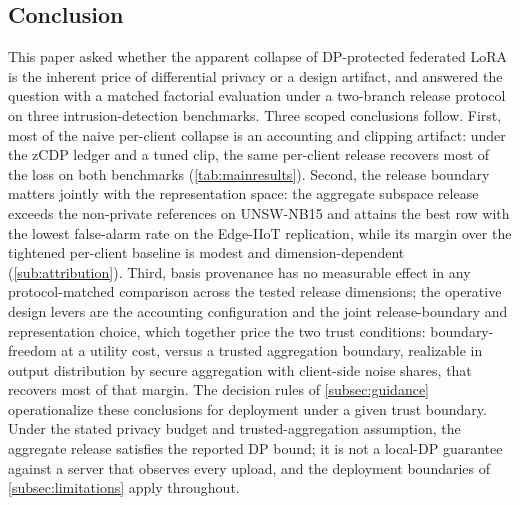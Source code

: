 \documentclass[a4paper,fleqn]{cas-dc}
\begin{document}
\subsection{Conclusion}
\par
This paper asked whether the apparent collapse of DP-protected federated
LoRA is the inherent price of differential privacy or a design artifact, and
answered the question with a matched factorial evaluation under a two-branch
release protocol on three intrusion-detection benchmarks. Three scoped
conclusions follow. First, most of the naive per-client collapse is an
accounting and clipping artifact: under the zCDP ledger and a tuned clip,
the same per-client release recovers most of the loss on both
benchmarks (\cref{tab:mainresults}). Second, the release boundary matters jointly with the
representation space: the aggregate subspace release exceeds the non-private
references on UNSW-NB15 and attains the best row with the lowest false-alarm
rate on the Edge-IIoT replication, while its margin over the tightened
per-client baseline is modest and dimension-dependent
(\cref{sub:attribution}). Third, basis provenance has no measurable
effect in any protocol-matched comparison across the tested release dimensions; the operative design levers are the
accounting configuration and the joint release-boundary and representation
choice, which together price the two trust conditions: boundary-freedom at a
utility cost, versus a trusted aggregation boundary, realizable in output
distribution by secure aggregation with client-side noise shares, that
recovers most of that margin. The decision rules of
\cref{subsec:guidance} operationalize these conclusions for
deployment under a given trust boundary. Under the stated privacy budget and
trusted-aggregation assumption, the aggregate release satisfies the reported
DP bound; it is not a local-DP guarantee against a server that observes every
upload, and the deployment boundaries of \cref{subsec:limitations}
apply throughout.
\par
\appendix
\renewcommand{\thetable}{\arabic{table}}
\renewcommand{\thefigure}{\arabic{figure}}
\par
\end{document}
